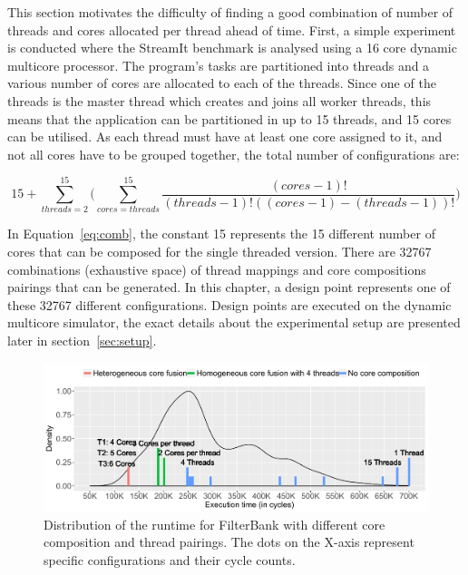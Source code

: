 
This section motivates the difficulty of finding a good combination of number of threads and cores allocated per thread ahead of time.
First, a simple experiment is conducted where the  StreamIt benchmark is analysed using a 16 core dynamic multicore processor.
The program's tasks are partitioned into threads and a various number of cores are allocated to each of the threads.
Since one of the threads is the master thread which creates and joins all worker threads, this means that the application can be partitioned in up to 15 threads, and 15 cores can be utilised.
As each thread must have at least one core assigned to it, and not all cores have to be grouped together, the total number of configurations are:

\begin{equation}
15 + \sum_{threads=2}^{15} \bigg( \sum_{cores=threads}^{15} \frac{(cores-1)!}{(threads-1)!((cores-1)-(threads-1))!}\bigg)
\label{eq:comb}
\end{equation}

In Equation~\ref{eq:comb}, the constant 15 represents the 15 different number of cores that can be composed for the single threaded version.
There are 32767 combinations (exhaustive space) of thread mappings and core compositions pairings that can be generated.
In this chapter, a design point represents one of these 32767 different configurations.
Design points are executed on the dynamic multicore simulator, the exact details about the experimental setup are presented later in section~\ref{sec:setup}.

\begin{figure}[t]
    \centering
    \includegraphics[width=1\textwidth]{streamit-paper/graphics/filterbank_motivation_2.pdf}
    \caption{Distribution of the runtime for FilterBank with different core composition and thread pairings. The dots on the X-axis represent specific configurations and their cycle counts.}
     \label{fig:threadcoremotiv}
\end{figure}

